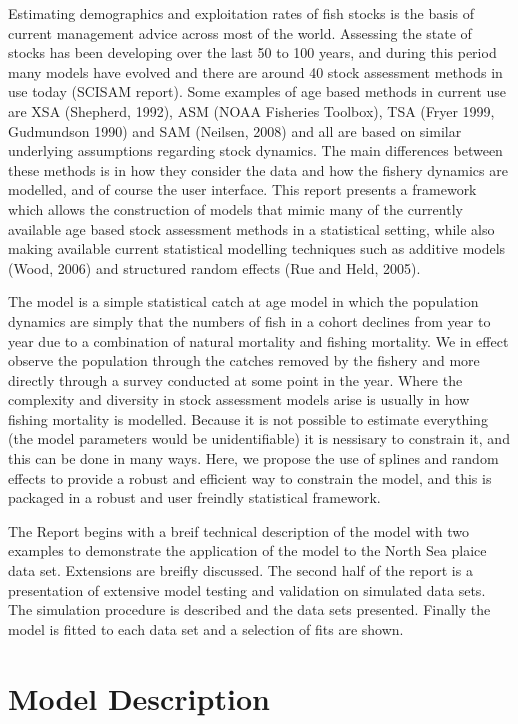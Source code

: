 \documentclass[a4paper]{article}\usepackage{graphicx, color}
\begin{document}
Estimating demographics and exploitation rates of fish stocks is the basis of current management advice across most of the world.  Assessing the state of stocks has been developing over the last 50 to 100 years, and during this period many models have evolved and there are around 40 stock assessment methods in use today (SCISAM report).  Some examples of age based methods in current use are XSA (Shepherd, 1992), ASM (NOAA Fisheries Toolbox), TSA (Fryer 1999, Gudmundson 1990) and SAM (Neilsen, 2008) and all are based on similar underlying assumptions regarding stock dynamics. The main differences between these methods is in how they consider the data and how the fishery dynamics are modelled, and of course the user interface. This report presents a framework which allows the construction of models that mimic many of the currently available age based stock assessment methods in a statistical setting, while also making available current statistical modelling techniques such as additive models (Wood, 2006) and structured random effects (Rue and Held, 2005).

The model is a simple statistical catch at age model in which the population dynamics are simply that the numbers of fish in a cohort declines from year to year due to a combination of natural mortality and fishing mortality.  We in effect observe the population through the catches removed by the fishery and more directly through a survey conducted at some point in the year.  Where the complexity and diversity in stock assessment models arise is usually in how fishing mortality is modelled.  Because it is not possible to estimate everything (the model parameters would be unidentifiable) it is nessisary to constrain it, and this can be done in many ways.  Here, we propose the use of splines and random effects to provide a robust and efficient way to constrain the model, and this is packaged in a robust and user freindly statistical framework.

The Report begins with a breif technical description of the model with two examples to demonstrate the application of the model to the North Sea plaice data set.  Extensions are breifly discussed.  The second half of the report is a presentation of extensive model testing and validation on simulated data sets.  The simulation procedure is described and the data sets presented.  Finally the model is fitted to each data set and a selection of fits are shown.

\section*{Model Description}
\end{document}
